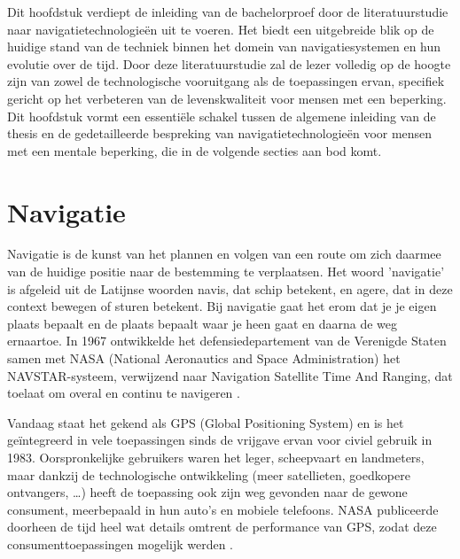 


Dit hoofdstuk verdiept de inleiding van de bachelorproef door de literatuurstudie naar navigatietechnologieën uit te voeren. Het biedt een uitgebreide blik op de huidige stand van de techniek binnen het domein van navigatiesystemen en hun evolutie over de tijd. Door deze literatuurstudie zal de lezer volledig op de hoogte zijn van zowel de technologische vooruitgang als de toepassingen ervan, specifiek gericht op het verbeteren van de levenskwaliteit voor mensen met een beperking. Dit hoofdstuk vormt een essentiële schakel tussen de algemene inleiding van de thesis en de gedetailleerde bespreking van navigatietechnologieën voor mensen met een mentale beperking, die in de volgende secties aan bod komt.
\section{Navigatie}
\label{sec:navigatie}

Navigatie is de kunst van het plannen en volgen van een route om zich daarmee van de huidige positie naar de bestemming te verplaatsen. Het woord ’navigatie’ is afgeleid uit de Latijnse woorden navis, dat schip betekent, en agere, dat in deze context bewegen of sturen betekent. Bij navigatie gaat het erom dat je je eigen plaats bepaalt en de plaats bepaalt waar je heen gaat en daarna de weg ernaartoe. 
In 1967 ontwikkelde het defensiedepartement van de Verenigde Staten samen met NASA (National Aeronautics and Space Administration) het NAVSTAR-systeem, verwijzend naar Navigation Satellite Time And Ranging, dat toelaat om overal en continu te navigeren \autocite{Bowditch2002}. 


Vandaag staat het gekend als GPS (Global Positioning System) en is het geïntegreerd in vele toepassingen sinds de vrijgave ervan voor civiel gebruik in 1983. Oorspronkelijke gebruikers waren het leger, scheepvaart en landmeters, maar dankzij de technologische ontwikkeling (meer satellieten, goedkopere ontvangers, …) heeft de toepassing ook zijn weg gevonden naar de gewone consument, meerbepaald in hun auto’s en mobiele telefoons. NASA publiceerde doorheen de tijd heel wat details omtrent de performance van GPS, zodat deze consumenttoepassingen mogelijk werden \autocite{Zaidman2008}.


